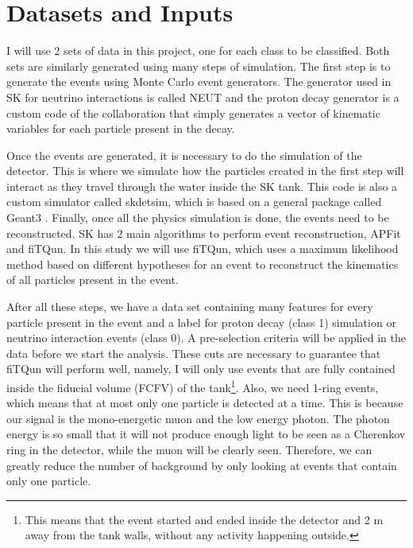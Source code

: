 
\section{Datasets and Inputs} \label{Data}

I will use 2 sets of data in this project, one for each class to be classified. Both sets are similarly generated using many steps of simulation. The first step is to generate the events using Monte Carlo event generators. The generator used in SK for neutrino interactions is called NEUT \cite{NEUT} and the proton decay generator is a custom code of the collaboration that simply generates a vector of kinematic variables for each particle present in the decay.

Once the events are generated, it is necessary to do the simulation of the detector. This is where we simulate how the particles created in the first step will interact as they travel through the water inside the SK tank. This code is also a custom simulator called skdetsim, which is based on a general package called Geant3 \cite{Geant}. Finally, once all the physics simulation is done, the events need to be reconstructed. SK has 2 main algorithms to perform event reconstruction, APFit and fiTQun. In this study we will use fiTQun, which uses a maximum likelihood method based on different hypotheses for an event to reconstruct the kinematics of all particles present in the event.

After all these steps, we have a data set containing many features for every particle present in the event and a label for proton decay (class 1) simulation or neutrino interaction events (class 0). A pre-selection criteria will be applied in the data before we start the analysis. These cuts are necessary to guarantee that fiTQun will perform well, namely, I will only use events that are fully contained inside the fiducial volume (FCFV) of the tank\footnote{This means that the event started and ended inside the detector and 2 m away from the tank walls, without any activity happening outside.}. Also, we need 1-ring events, which means that at most only one particle is detected at a time. This is because our signal is the mono-energetic muon and the low energy photon. The photon energy is so small that it will not produce enough light to be seen as a Cherenkov ring in the detector, while the muon will be clearly seen. Therefore, we can greatly reduce  the number of background by only looking at events that contain only one particle.

